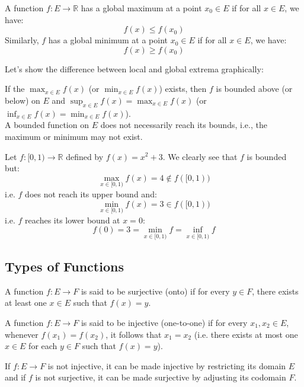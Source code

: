 \begin{definition}
    A function $f: E \to \mathbb{R}$ has a global maximum at a point $x_0 \in E$ if for all $x \in E$, we have:
    \[
        f(x) \leq f(x_0)
    \]
    Similarly, $f$ has a global minimum at a point $x_0 \in E$ if for all $x \in E$, we have:
    \[
        f(x) \geq f(x_0)
    \]
\end{definition}
\begin{eg}
    Let's show the difference between local and global extrema graphically:
    \begin{center}
    \end{center}
\end{eg}
If the $\max_{x \in E} f(x)$ (or $\min_{x \in E} f(x)$) exists, then $f$ is bounded above (or below) on $E$ and $\sup_{x \in E} f(x) = \max_{x \in E} f(x)$ (or $\inf_{x \in E} f(x) = \min_{x \in E} f(x)$). \\
A bounded function on $E$ does not necessarily reach its bounds, i.e., the maximum or minimum may not exist.
\begin{eg}
    Let $f: [0, 1) \to \mathbb{R}$ defined by $f(x) = x^2 + 3$. We clearly see that $f$ is bounded but:
    \[
        \max_{x \in [0, 1)} f(x) = 4 \notin f([0, 1))
    \]
    i.e. $f$ does not reach its upper bound and:
    \[
        \min_{x \in [0, 1)} f(x) = 3 \in f([0, 1))
    \]
    i.e. $f$ reaches its lower bound at $x = 0$:
    \[
        f(0) = 3 = \min_{x \in [0, 1)} f = \inf_{x \in [0, 1)} f
    \]
\end{eg}

\subsection{Types of Functions}
\begin{definition}[Surjectivity]
    A function $f : E \to F$ is said to be surjective (onto) if for every $y \in F$, there exists at least one $x \in E$ such that $f(x) = y$.
\end{definition}
\begin{definition}[Injectivity]
    A function $f : E \to F$ is said to be injective (one-to-one) if for every $x_1, x_2 \in E$, whenever $f(x_1) = f(x_2)$, it follows that $x_1 = x_2$ (i.e. there exists at most one $x \in E$ for each $y \in F$ such that $f(x) = y$).
\end{definition}
If $f: E \to F$ is not injective, it can be made injective by restricting its domain $E$ and if $f$ is not surjective, it can be made surjective by adjusting its codomain $F$.

